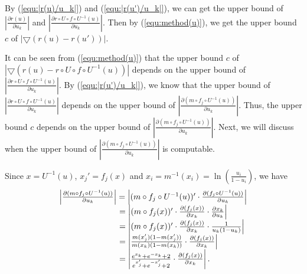 By (\ref{equ:|r(u)/u_k|}) and (\ref{equ:|r(u')/u_k|}), we can get the upper bound of $\left| {\frac{{\partial r(u)}}{{\partial {u_k}}}} \right|$ and $\left| {\frac{{\partial r \circ U \circ f \circ {U^{ - 1}}(u)}}{{\partial {u_k}}}} \right|$. Then by (\ref{equ:method(u)}), we get the upper bound $c$ of $\left| \bigtriangledown{(r(u) - r(u'))} \right|$.

It can be seen from (\ref{equ:method(u)}) that the upper bound $c$ of $\left| \bigtriangledown(r(u) - r \circ U \circ f \circ {U^{ - 1}}(u)) \right|$ depends on the upper bound of $\left| {\frac{{\partial r \circ U \circ f \circ {U^{ - 1}}(u)}}{{\partial {u_k}}}} \right|$. By (\ref{equ:|r(u')/u_k|}), we know that the upper bound of $\left| {\frac{{\partial r \circ U \circ f \circ {U^{ - 1}}(u)}}{{\partial {u_k}}}} \right|$ depends on the upper bound of ${\left| {\frac{{\partial (m \circ {f_j} \circ {U^{ - 1}}(u))}}{{\partial {u_k}}}} \right|}$. Thus, the upper bound $c$ depends on the upper bound of ${\left| {\frac{{\partial (m \circ {f_j} \circ {U^{ - 1}}(u))}}{{\partial {u_k}}}} \right|}$. Next, we will discuss when the upper bound of ${\left| {\frac{{\partial (m \circ {f_j} \circ {U^{ - 1}}(u))}}{{\partial {u_k}}}} \right|}$ is computable.

Since $x=U^{-1}(u)$, $x_{j}'=f_{j}(x)$ and ${x_i} = m^{-1}(x_i)=\ln (\frac{{{u_i}}}{{1 - {u_i}}})$, we have 
\begin{equation}{\label{equ:computing c}}
\begin{array}{l}
\left| {\frac{{\partial (m \circ {f_j} \circ {U^{ - 1}}(u))}}{{\partial {u_k}}}} \right| = \left| {(m \circ {f_j} \circ {U^{ - 1}}(u))'\cdot\frac{{\partial ({f_j} \circ {U^{ - 1}}(u))}}{{\partial {u_k}}}} \right|\\
\quad \quad \;\;\quad \quad \;\;\quad \quad \, = \left| {(m \circ {f_j}(x))'\cdot\frac{{\partial ({f_j}(x))}}{{\partial {x_k}}}\cdot\frac{{\partial {x_k}}}{{\partial {u_k}}}} \right|\\
\quad \quad \;\;\quad \quad \;\;\quad \quad\,  = \left| {(m \circ {f_j}(x))'\cdot\frac{{\partial ({f_j}(x))}}{{\partial {x_k}}}\cdot\frac{1}{{{u_k}(1 - {u_k})}}} \right|\\
\quad \quad \;\;\quad \quad \;\;\quad \quad\,  = \left| {\frac{{m({x_{j}'})(1 - m({x_{j}'}))}}{{m({x_k})(1 - m({x_k}))}}\cdot\frac{{\partial ({f_j}(x))}}{{\partial {x_k}}}} \right|\\
\quad \quad \;\;\quad \quad \;\;\quad \quad  \,= \left| {\frac{{{e^{{x_k}}} + {e^{ - {x_k}}} + 2}}{{{e^{{x_{j}'}}} + {e^{ - {x_{j}'}}} + 2}}\cdot\frac{{\partial ({f_j}(x))}}{{\partial {x_k}}}} \right|.
\end{array}
\end{equation}


